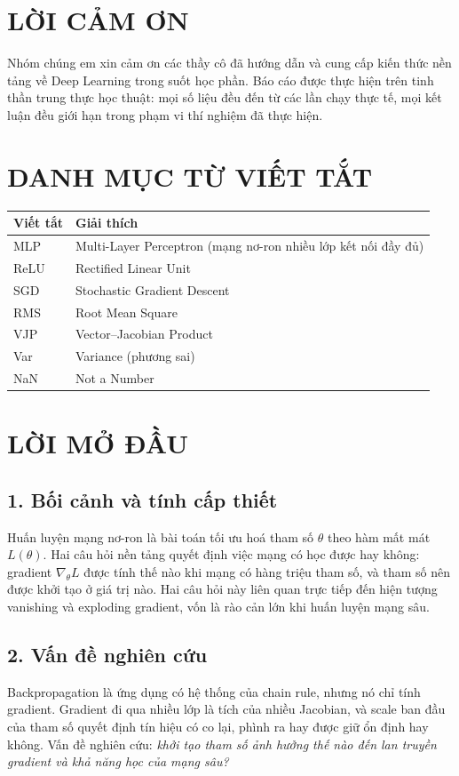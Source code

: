 \documentclass[12pt,a4paper]{report}
\begin{document}

\chapter*{LỜI CẢM ƠN}
Nhóm chúng em xin cảm ơn các thầy cô đã hướng dẫn và cung cấp kiến thức nền tảng về Deep Learning trong suốt học phần. Báo cáo được thực hiện trên tinh thần trung thực học thuật: mọi số liệu đều đến từ các lần chạy thực tế, mọi kết luận đều giới hạn trong phạm vi thí nghiệm đã thực hiện.

\chapter*{DANH MỤC TỪ VIẾT TẮT}
\begin{tabularx}{\textwidth}{lX}
\toprule
Viết tắt & Giải thích \\
\midrule
MLP & Multi-Layer Perceptron (mạng nơ-ron nhiều lớp kết nối đầy đủ) \\
ReLU & Rectified Linear Unit \\
SGD & Stochastic Gradient Descent \\
RMS & Root Mean Square \\
VJP & Vector--Jacobian Product \\
Var & Variance (phương sai) \\
NaN & Not a Number \\
\bottomrule
\end{tabularx}

\tableofcontents
\listoftables
\listoffigures

\chapter*{LỜI MỞ ĐẦU}

\section*{1. Bối cảnh và tính cấp thiết}
Huấn luyện mạng nơ-ron là bài toán tối ưu hoá tham số $\theta$ theo hàm mất mát $L(\theta)$. Hai câu hỏi nền tảng quyết định việc mạng có học được hay không: gradient $\nabla_\theta L$ được tính thế nào khi mạng có hàng triệu tham số, và tham số nên được khởi tạo ở giá trị nào. Hai câu hỏi này liên quan trực tiếp đến hiện tượng vanishing và exploding gradient, vốn là rào cản lớn khi huấn luyện mạng sâu.

\section*{2. Vấn đề nghiên cứu}
Backpropagation là ứng dụng có hệ thống của chain rule, nhưng nó chỉ tính gradient. Gradient đi qua nhiều lớp là tích của nhiều Jacobian, và scale ban đầu của tham số quyết định tín hiệu có co lại, phình ra hay được giữ ổn định hay không. Vấn đề nghiên cứu: \emph{khởi tạo tham số ảnh hưởng thế nào đến lan truyền gradient và khả năng học của mạng sâu?}
\end{document}
